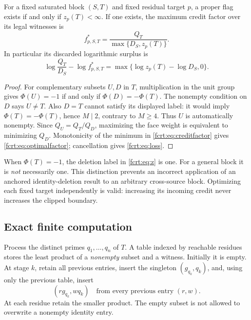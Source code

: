 \begin{theorem}\label{fcrt:thm:normal}
For a fixed saturated block \((S,T)\) and fixed residual target \(p\), a
proper flag exists if and only if \(z_p(T)<\infty\). If one exists, the
maximum credit factor over its legal witnesses is
\begin{equation}\label{fcrt:eq:optimalfactor}
 f^*_{p,S,T}=\frac{Q_T}{\max\{D_S,z_p(T)\}}.
\end{equation}
In particular its discarded logarithmic surplus is
\begin{equation}\label{fcrt:eq:loss}
 \log\frac{Q_T}{D_S}-\log f^*_{p,S,T}
       =\max\{\log z_p(T)-\log D_S,0\}.
\end{equation}
\end{theorem}
\begin{proof}
For complementary subsets \(U,D\) in \(T\), multiplication in the unit
group gives
\(\Phi(U)=-1\) if and only if \(\Phi(D)=-\Phi(T)\).
The nonempty condition on \(D\) says \(U\ne T\). Also \(D=T\) cannot
satisfy its displayed label: it would imply \(\Phi(T)=-\Phi(T)\), hence
\(M\mid2\), contrary to \(M\ge4\). Thus \(U\) is automatically nonempty.
Since \(Q_U=Q_T/Q_D\), maximizing the face weight is equivalent to minimizing
\(Q_D\). Monotonicity of the minimum in \eqref{fcrt:eq:creditfactor} gives
\eqref{fcrt:eq:optimalfactor}; cancellation gives \eqref{fcrt:eq:loss}.
\end{proof}

When \(\Phi(T)=-1\), the deletion label in \eqref{fcrt:eq:z} is one. For a
general block it is \emph{not} necessarily one. This distinction prevents
an incorrect application of an anchored identity-deletion result to an
arbitrary cross-source block. Optimizing each fixed target independently is
valid: increasing its incoming credit never increases the clipped boundary.

\subsection{Exact finite computation}
Process the distinct primes \(q_1,\ldots,q_n\) of \(T\). A table indexed
by reachable residues stores the least product of a \emph{nonempty} subset
and a witness. Initially it is empty. At stage \(k\), retain all previous
entries, insert the singleton \((g_{q_k},q_k)\), and, using only the previous
table, insert
\[
      (r g_{q_k},wq_k)\quad\text{from every previous entry }(r,w).
\]
At each residue retain the smaller product. The empty subset is not allowed
to overwrite a nonempty identity entry.

